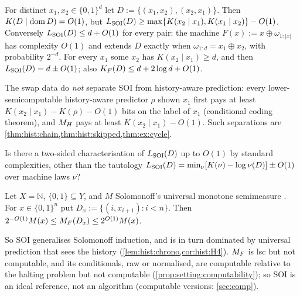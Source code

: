 \begin{example}\label{ex:setting:swap}
For distinct $x_1,x_2\in\{0,1\}^d$ let $D:=\{(x_1,x_2),(x_2,x_1)\}$. Then $K(D\mid\operatorname{dom} D)=O(1)$, but $L_{\mathrm{SOI}}(D)\ge\max\{K(x_2\mid x_1),K(x_1\mid x_2)\}-O(1)$. Conversely $L_{\mathrm{SOI}}(D)\le d+O(1)$ for every pair: the machine $F(x):=x\oplus\omega_{1:|x|}$ has complexity $O(1)$ and extends $D$ exactly when $\omega_{1:d}=x_1\oplus x_2$, with probability $2^{-d}$. For every $x_1$ some $x_2$ has $K(x_2\mid x_1)\ge d$, and then $L_{\mathrm{SOI}}(D)=d\pm O(1)$; also $K_{F}(D)\le d+2\log d+O(1)$.
\end{example}

The swap data do \emph{not} separate SOI from history-aware prediction: every lower-semicomputable history-aware predictor $\rho$ shown $x_1$ first pays at least $K(x_2\mid x_1)-K(\rho)-O(1)$ bits on the label of $x_1$ (conditional coding theorem), and $M_{H}$ pays at least $K(x_2\mid x_1)-O(1)$. Such separations are \cref{thm:hist:chain,thm:hist:skipped,thm:ex:cycle}.

\begin{question}\label{q:setting:twosided}
Is there a two-sided characterisation of $L_{\mathrm{SOI}}(D)$ up to $O(1)$ by standard complexities, other than the tautology $L_{\mathrm{SOI}}(D)=\min_\nu[K(\nu)-\log\nu(D)]\pm O(1)$ over machine laws $\nu$?
\end{question}

\begin{proposition}\label{prop:setting:si}
Let $X=\mathbb N$, $\{0,1\}\subseteq Y$, and $M$ Solomonoff's universal monotone semimeasure \citep{zvonkin1970complexity}. For $x\in\{0,1\}^n$ put $D_x:=\{(i,x_{i+1}):i<n\}$. Then $2^{-O(1)}M(x)\le M_{F}(D_x)\le2^{O(1)}M(x)$.
\end{proposition}

So SOI generalises Solomonoff induction, and is in turn dominated by universal prediction that sees the history (\cref{lem:hist:chrono,cor:hist:H4}). $M_{F}$ is lsc but not computable, and its conditionals, raw or normalised, are computable relative to the halting problem but not computable (\cref{prop:setting:computability}); so SOI is an ideal reference, not an algorithm (computable versions: \cref{sec:comp}).

